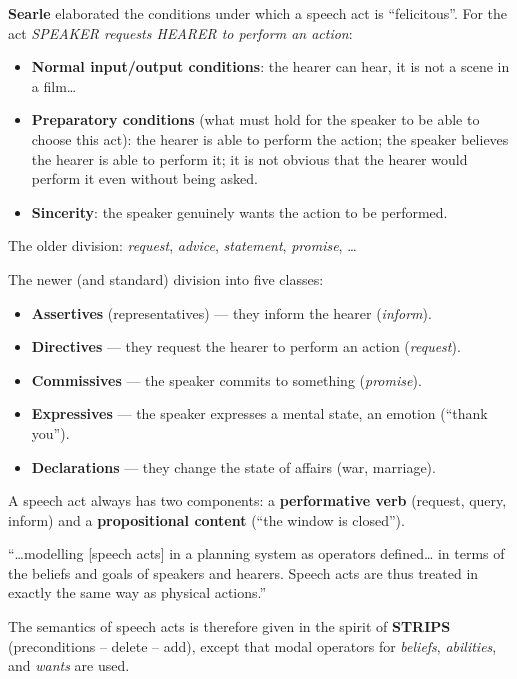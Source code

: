 \documentclass[11pt,a4paper]{article}
\theoremstyle{definition}
\providecommand{\uv}[1]{``#1''}
\begin{document}
\textbf{Searle} elaborated the conditions under which a speech act is \uv{felicitous}.
For the act \emph{SPEAKER requests HEARER to perform an action}:
\begin{itemize}
\item \textbf{Normal input/output conditions}: the hearer can hear, it is not a scene in a film\dots
\item \textbf{Preparatory conditions} (what must hold for the speaker to be able to choose this act):
  the hearer is able to perform the action; the speaker believes the hearer is able to perform it; it
  is not obvious that the hearer would perform it even without being asked.
\item \textbf{Sincerity}: the speaker genuinely wants the action to be performed.
\end{itemize}

\begin{defbox}
The older division: \emph{request}, \emph{advice}, \emph{statement}, \emph{promise}, \dots

The newer (and standard) division into five classes:
\begin{itemize}
\item \textbf{Assertives} (representatives) --- they inform the hearer (\emph{inform}).
\item \textbf{Directives} --- they request the hearer to perform an action (\emph{request}).
\item \textbf{Commissives} --- the speaker commits to something (\emph{promise}).
\item \textbf{Expressives} --- the speaker expresses a mental state, an emotion
  (\uv{thank you}).
\item \textbf{Declarations} --- they change the state of affairs (war, marriage).
\end{itemize}
A speech act always has two components: a \textbf{performative verb} (request, query, inform)
and a \textbf{propositional content} (\uv{the window is closed}).
\end{defbox}

\begin{defbox}
\uv{\dots modelling [speech acts] in a planning system as operators defined\dots{}
in terms of the beliefs and goals of speakers and hearers. Speech acts are thus treated in exactly the
same way as physical actions.}

The semantics of speech acts is therefore given in the spirit of \textbf{STRIPS} (preconditions --
delete -- add), except that modal operators for \emph{beliefs}, \emph{abilities}, and \emph{wants} are
used.
\end{defbox}
\end{document}
